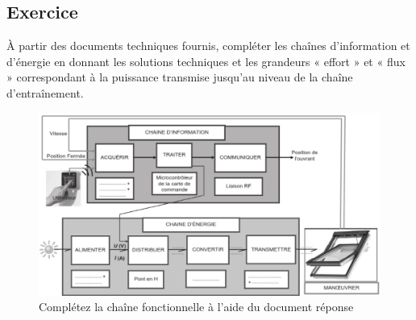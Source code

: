 \documentclass[
	11pt, %
	fleqn, %
	a4paper, %
]{LegrandOrangeBook}
\begin{document}
\subsection{Exercice}
À partir des documents techniques fournis, compléter les chaînes d’information et d’énergie en donnant les solutions techniques et les grandeurs « effort » et « flux » correspondant à la puissance transmise jusqu’au niveau de la
chaîne d’entraînement.

\begin{tcolorbox}[colback=gray!5!white,colframe=gray!75!ocre,title=Fenêtre de toit VELUX]

\begin{figure}[H] %
	\centering %
	\includegraphics[width=1\textwidth]{Images/chaine5.JPG} %
	\caption{Complétez la chaîne fonctionnelle à l'aide du document réponse}
	\label{chaine5} %
\end{figure}
\end{tcolorbox}
\end{document}
